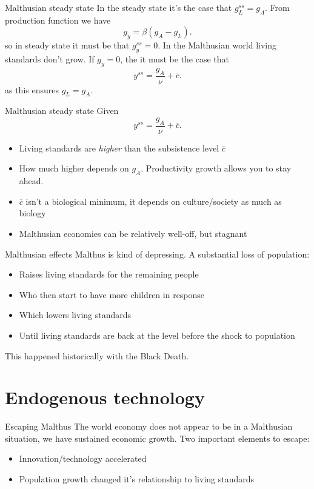 \begin{frame}{Malthusian steady state}
In the steady state it's the case that $g_L^{ss} = g_A$. From production function we have
\begin{equation}
	g_y = \beta(g_A - g_L). \label{EQ_gy_malthus}
\end{equation}
so in steady state it must be that $g_y^{ss} = 0$. In the Malthusian world living standards don't grow.
\vspace{.25in}\noindent
If $g_y = 0$, the it must be the case that
\begin{equation}
	y^{ss} = \frac{g_A}{\nu} + \overline{c}. \label{EQ_yss_malthus}
\end{equation}
as this ensures $g_L = g_A$. 
\end{frame}

\begin{frame}{Malthusian steady state}
Given
\begin{equation}
	y^{ss} = \frac{g_A}{\nu} + \overline{c}. \label{EQ_yss_malthus}
\end{equation}
\begin{itemize}
	\item Living standards are \textit{higher} than the subsistence level $\overline{c}$
	\item How much higher depends on $g_A$. Productivity growth allows you to stay ahead.
	\item $\overline{c}$ isn't a biological minimum, it depends on culture/society as much as biology
	\item Malthusian economies can be relatively well-off, but stagnant
\end{itemize}
\end{frame}

\begin{frame}{Malthusian effects}
Malthus is kind of depressing. A substantial loss of population:
\begin{itemize}
	\item Raises living standards for the remaining people
	\item Who then start to have more children in response
	\item Which lowers living standards
	\item Until living standards are back at the level before the shock to population
\end{itemize}
This happened historically with the Black Death. 
\end{frame}

\section{Endogenous technology}
\begin{frame}{Escaping Malthus}
The world economy does not appear to be in a Malthusian situation, we have sustained economic growth. Two important elements to escape:
\begin{itemize}
	\item Innovation/technology accelerated
	\item Population growth changed it's relationship to living standards
\end{itemize}
\end{frame}

